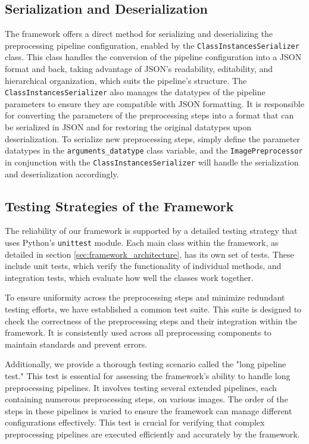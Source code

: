 \documentclass[journal]{new-aiaa}
\begin{document}
\subsection{Serialization and Deserialization}
The framework offers a direct method for serializing and deserializing the preprocessing pipeline configuration, enabled by  the \texttt{ClassInstancesSerializer} class. This class handles the conversion of the pipeline configuration into a JSON format and back, taking advantage of JSON's readability, editability, and hierarchical organization, which suits the pipeline's structure. The \texttt{ClassInstancesSerializer} also manages the datatypes of the pipeline parameters to ensure they are compatible with JSON formatting. It is responsible for converting the parameters of the preprocessing steps into a format that can be serialized in JSON and for restoring the original datatypes upon deserialization. To serialize new preprocessing steps, simply define the parameter datatypes in the \texttt{arguments\_datatype} class variable, and the \texttt{ImagePreprocessor} in conjunction with the \texttt{ClassInstancesSerializer} will handle the serialization and deserialization accordingly.


\subsection{Testing Strategies of the Framework}
The reliability of our framework is supported by a detailed testing strategy that uses Python's \texttt{unittest} module.\cite{unittestPython} Each main class within the framework, as detailed in section \ref{sec:framework_architecture}, has its own set of tests. These include unit tests, which verify the functionality of individual methods, and integration tests, which evaluate how well the classes work together.

To ensure uniformity across the preprocessing steps and minimize redundant testing efforts, we have established a common test suite. This suite is designed to check the correctness of the preprocessing steps and their integration within the framework. It is consistently used across all preprocessing components to maintain standards and prevent errors.

Additionally, we provide a thorough testing scenario called the "long pipeline test." This test is essential for assessing the framework’s ability to handle long preprocessing pipelines. It involves testing several extended pipelines, each containing numerous preprocessing steps, on various images. The order of the steps in these pipelines is varied to ensure the framework can manage different configurations effectively. This test is crucial for verifying that complex preprocessing pipelines are executed efficiently and accurately by the framework.
\end{document}

